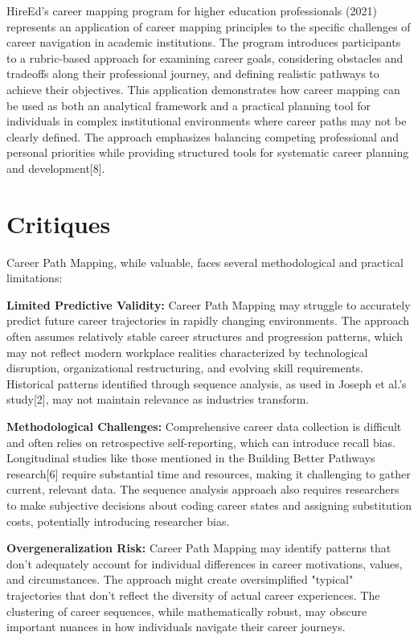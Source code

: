 \documentclass{article}
\begin{document}
HireEd's career mapping program for higher education professionals (2021) represents an application of career mapping principles to the specific challenges of career navigation in academic institutions. The program introduces participants to a rubric-based approach for examining career goals, considering obstacles and tradeoffs along their professional journey, and defining realistic pathways to achieve their objectives. This application demonstrates how career mapping can be used as both an analytical framework and a practical planning tool for individuals in complex institutional environments where career paths may not be clearly defined. The approach emphasizes balancing competing professional and personal priorities while providing structured tools for systematic career planning and development[8].

\section{Critiques}

Career Path Mapping, while valuable, faces several methodological and practical limitations:

\textbf{Limited Predictive Validity:} Career Path Mapping may struggle to accurately predict future career trajectories in rapidly changing environments. The approach often assumes relatively stable career structures and progression patterns, which may not reflect modern workplace realities characterized by technological disruption, organizational restructuring, and evolving skill requirements. Historical patterns identified through sequence analysis, as used in Joseph et al.'s study[2], may not maintain relevance as industries transform.

\textbf{Methodological Challenges:} Comprehensive career data collection is difficult and often relies on retrospective self-reporting, which can introduce recall bias. Longitudinal studies like those mentioned in the Building Better Pathways research[6] require substantial time and resources, making it challenging to gather current, relevant data. The sequence analysis approach also requires researchers to make subjective decisions about coding career states and assigning substitution costs, potentially introducing researcher bias.

\textbf{Overgeneralization Risk:} Career Path Mapping may identify patterns that don't adequately account for individual differences in career motivations, values, and circumstances. The approach might create oversimplified "typical" trajectories that don't reflect the diversity of actual career experiences. The clustering of career sequences, while mathematically robust, may obscure important nuances in how individuals navigate their career journeys.
\end{document}

